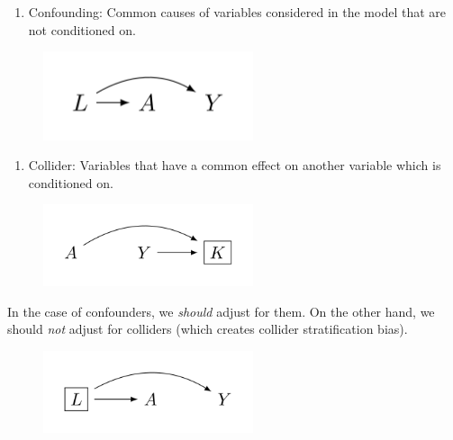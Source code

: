 \documentclass[
  letterpaper,
  DIV=11,
  numbers=noendperiod]{scrreport}
\providecommand{\tightlist}{%
  \setlength{\itemsep}{0pt}\setlength{\parskip}{0pt}}\usepackage{longtable,booktabs,array}
\begin{document}
\begin{enumerate}
\def\labelenumi{\arabic{enumi}.}
\setcounter{enumi}{1}
\tightlist
\item
  Confounding: Common causes of variables considered in the model that
  are not conditioned on.
\end{enumerate}

\begin{figure}

{\centering \includegraphics[width=0.55\textwidth,height=\textheight]{week5/standalone_figures/confounder/confounder.svg}

}

\end{figure}

\begin{enumerate}
\def\labelenumi{\arabic{enumi}.}
\setcounter{enumi}{2}
\tightlist
\item
  Collider: Variables that have a common effect on another variable
  which is conditioned on.
\end{enumerate}

\begin{figure}

{\centering \includegraphics[width=0.55\textwidth,height=\textheight]{week5/standalone_figures/collider/collider.svg}

}

\end{figure}

In the case of confounders, we \emph{should} adjust for them. On the
other hand, we should \emph{not} adjust for colliders (which creates
collider stratification bias).

\begin{figure}

{\centering \includegraphics[width=0.55\textwidth,height=\textheight]{week5/standalone_figures/confounder/controlled_confounder/controlled_confounder.svg}

}

\end{figure}
\end{document}
